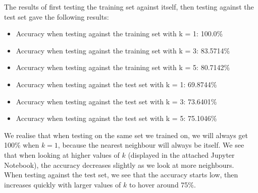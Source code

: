 The results of first testing the training set against itself, then testing against the test set gave the following results:
\begin{itemize}
\item Accuracy when testing against the training set with k = 1: 100.0\%
\item Accuracy when testing against the training set with k = 3: 83.5714\%
\item Accuracy when testing against the training set with k = 5: 80.7142\%
\item Accuracy when testing against the test set with k = 1: 69.8744\%
\item Accuracy when testing against the test set with k = 3: 73.6401\%
\item Accuracy when testing against the test set with k = 5: 75.1046\%
\end{itemize}
We realise that when testing on the same set we trained on, we will always get 100\% when $k=1$, because the nearest neighbour will always be itself. We see that when looking at higher values of $k$ (displayed in the attached Jupyter Notebook), the accuracy decreases slightly as we look at more neighbours.\\
When testing against the test set, we see that the accuracy starts low, then increases quickly with larger values of $k$ to hover around 75\%.